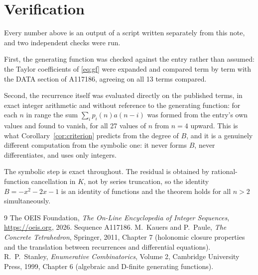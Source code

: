 \documentclass[11pt,a4paper]{article}
\theoremstyle{plain}
\theoremstyle{definition}
\begin{document}
\section{Verification}

Every number above is an output of a script written separately from this note, and two
independent checks were run.

First, the generating function was checked against the entry rather than assumed: the
Taylor coefficients of \eqref{eq:gf} were expanded and compared term by term with the DATA
section of A117186, agreeing on all 13 terms compared.

Second, the recurrence itself was evaluated directly on the published terms, in exact
integer arithmetic and without reference to the generating function: for each $n$ in range
the sum $\sum_{i}p_{i}(n)a(n-i)$ was formed from the entry's own values and found to
vanish, for all 27 values of $n$ from $n=4$ upward. This is what
Corollary~\ref{cor:criterion} predicts from the degree of $B$, and it is a genuinely
different computation from the symbolic one: it never forms $B$, never differentiates, and
uses only integers.

The symbolic step is exact throughout. The residual is obtained by rational-function
cancellation in $K$, not by series truncation, so the identity $B=- x^{2} - 2 x - 1$ is an
identity of functions and the theorem holds for all $n>2$ simultaneously.

\begin{thebibliography}{9}
 The OEIS Foundation, \emph{The On-Line Encyclopedia of Integer Sequences},
\url{https://oeis.org}, 2026. Sequence A117186.
 M.~Kauers and P.~Paule, \emph{The Concrete Tetrahedron}, Springer, 2011,
Chapter 7 (holonomic closure properties and the translation between recurrences and
differential equations).
 R.~P.~Stanley, \emph{Enumerative Combinatorics}, Volume 2, Cambridge
University Press, 1999, Chapter 6 (algebraic and D-finite generating functions).
\end{thebibliography}
\end{document}
